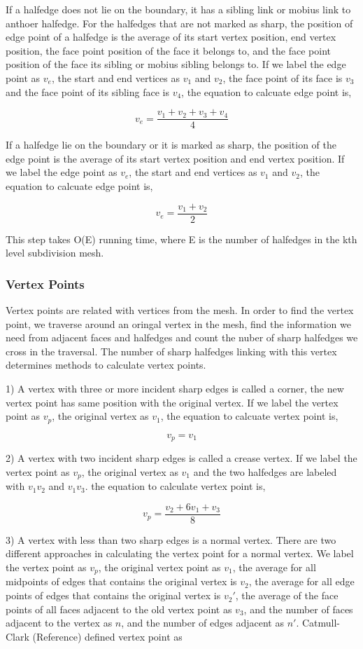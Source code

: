 \documentclass[12pt]{article}
\begin{document}
If a halfedge does not lie on the boundary, it has a sibling link or mobius link to anthoer halfedge. For the halfedges that are not marked as sharp, the position of edge point of a halfedge is the average of its start vertex position, end vertex position, the face point position of the face it belongs to, and the face point position of the face its sibling or mobius sibling belongs to. If we label the edge point as $v_e$, the start and end vertices as $v_1$ and $v_2$, the face point of its face is $v_3$ and the face point of its sibling face is $v_4$, the equation to calcuate edge point is,

$$v_e = \frac{v_1 + v_2 + v_3 + v_4}{4}$$

If a halfedge lie on the boundary or it is marked as sharp, the position of the edge point is the average of its start vertex position and end vertex position. If we label the edge point as $v_e$, the start and end vertices as $v_1$ and $v_2$, the equation to calcuate edge point is,

$$v_e = \frac{v_1 + v_2}{2}$$

This step takes O(E) running time, where E is the number of halfedges in the kth level subdivision mesh.

\subsubsection{Vertex Points}
Vertex points are related with vertices from the mesh. In order to find the vertex point, we traverse around an oringal vertex in the mesh, find the information we need from adjacent faces and halfedges and count the nuber of sharp halfedges we cross in the traversal. The number of sharp halfedges linking with this vertex determines methods to calculate vertex points.

1) A vertex with three or more incident sharp edges is called a corner, the new vertex point has same position with the original vertex. If we label the vertex point as $v_p$, the original vertex as $v_1$, the equation to calcuate vertex point is,

$$v_p = v_1$$

2) A vertex with two incident sharp edges is called a crease vertex. If we label the vertex point as $v_p$, the original vertex as $v_1$ and the two halfedges are labeled with $v_1v_2$ and $v_1v_3$. the equation to calculate vertex point is,

$$v_p=\frac{v_2 + 6v_1 + v_3}{8}$$

3) A vertex with less than two sharp edges is a normal vertex. There are two different approaches in calculating the vertex point for a normal vertex. We label the vertex point as $v_p$, the original vertex point as $v_1$, the average for all midpoints of edges that contains the original vertex is $v_2$, the average for all edge points of edges that contains the original vertex is $v_2'$, the average of the face points of all faces adjacent to the old vertex point as $v_3$, and the number of faces adjacent to the vertex as $n$, and the number of edges adjacent as $n'$. Catmull-Clark (Reference) defined vertex point as 
\end{document}
